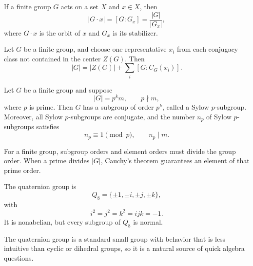     \begin{theorem}
        If a finite group $G$ acts on a set $X$ and $x\in X$, then
        \[
            |G\cdot x|
            =
            [G:G_x]
            =
            \frac{|G|}{|G_x|},
        \]
        where $G\cdot x$ is the orbit of $x$ and $G_x$ is its stabilizer.
    \end{theorem}

    \begin{theorem}
        Let $G$ be a finite group, and choose one representative $x_i$ from
        each conjugacy class not contained in the center $Z(G)$. Then
        \[
            |G|
            =
            |Z(G)|
            +
            \sum_i [G:C_G(x_i)].
        \]
    \end{theorem}

    \begin{theorem}
        Let $G$ be a finite group and suppose
        \[
            |G|=p^k m,
            \qquad
            p\nmid m,
        \]
        where $p$ is prime. Then $G$ has a subgroup of order $p^k$, called a
        Sylow $p$-subgroup. Moreover, all Sylow $p$-subgroups are conjugate, and
        the number $n_p$ of Sylow $p$-subgroups satisfies
        \[
            n_p\equiv 1\pmod p,
            \qquad
            n_p\mid m.
        \]
    \end{theorem}

    \begin{strategy}
        For a finite group, subgroup orders and element orders must divide the group
        order. When a
        prime divides $|G|$, Cauchy's theorem guarantees an element of that prime
        order.
    \end{strategy}

    \begin{fact}
        The quaternion group is
        \[
            Q_8=\{\pm 1,\pm i,\pm j,\pm k\},
        \]
        with
        \[
            i^2=j^2=k^2=ijk=-1.
        \]
        It is nonabelian, but every subgroup of $Q_8$ is normal.
    \end{fact}

    \begin{remark}
        The quaternion group is a standard small group with behavior that is
        less intuitive than cyclic or dihedral groups, so it is a natural
        source of quick algebra questions.
    \end{remark}

